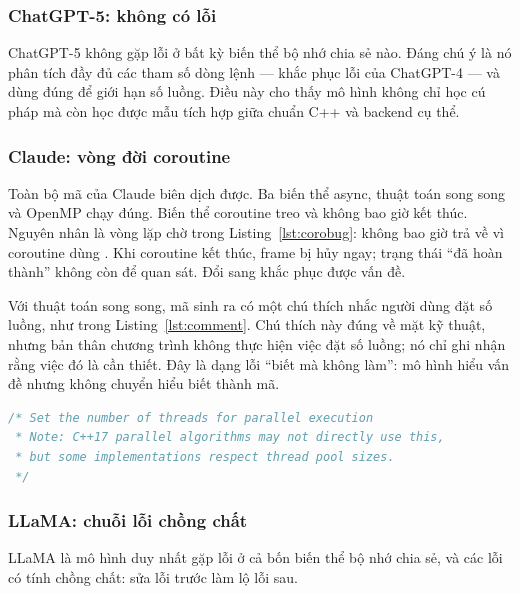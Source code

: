 \subsubsection{ChatGPT-5: không có lỗi}

ChatGPT-5 không gặp lỗi ở bất kỳ biến thể bộ nhớ chia sẻ nào. Đáng chú ý là nó
phân tích đầy đủ các tham số dòng lệnh — khắc phục lỗi của ChatGPT-4 — và dùng
đúng  để giới hạn số luồng. Điều này cho thấy mô hình
không chỉ học cú pháp mà còn học được mẫu tích hợp giữa chuẩn C++ và backend cụ
thể.

\subsubsection{Claude: vòng đời coroutine}

Toàn bộ mã của Claude biên dịch được. Ba biến thể async, thuật toán song song và
OpenMP chạy đúng. Biến thể coroutine treo và không bao giờ kết thúc. Nguyên nhân
là vòng lặp chờ trong Listing~\ref{lst:corobug}:  không bao giờ trả
về  vì coroutine dùng . Khi
coroutine kết thúc, frame bị hủy ngay; trạng thái “đã hoàn thành” không còn để
quan sát. Đổi sang  khắc phục được vấn đề.

Với thuật toán song song, mã sinh ra có một chú thích nhắc người dùng đặt số
luồng, như trong Listing~\ref{lst:comment}. Chú thích này đúng về mặt kỹ thuật,
nhưng bản thân chương trình không thực hiện việc đặt số luồng; nó chỉ ghi nhận
rằng việc đó là cần thiết. Đây là dạng lỗi “biết mà không làm”: mô hình hiểu vấn
đề nhưng không chuyển hiểu biết thành mã.

\begin{lstlisting}[language=C++,caption={Chú thích về số luồng trong mã Claude (Listing 3 trong bài báo).},label={lst:comment}]
/* Set the number of threads for parallel execution
 * Note: C++17 parallel algorithms may not directly use this,
 * but some implementations respect thread pool sizes.
 */
\end{lstlisting}

\subsubsection{LLaMA: chuỗi lỗi chồng chất}

LLaMA là mô hình duy nhất gặp lỗi ở cả bốn biến thể bộ nhớ chia sẻ, và các lỗi có
tính chồng chất: sửa lỗi trước làm lộ lỗi sau.

